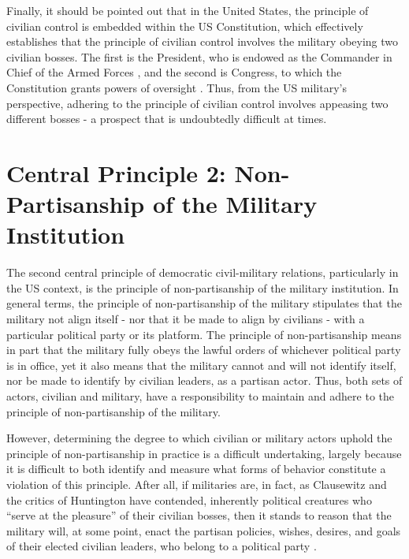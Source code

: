 \documentclass[
  12pt,
  oneside]{memoir}
\begin{document}
Finally, it should be pointed out that in the United States, the principle of civilian control is embedded within the US Constitution, which effectively establishes that the principle of civilian control involves the military obeying two civilian bosses. The first is the President, who is endowed as the Commander in Chief of the Armed Forces \autocite[Article 2, Section 2]{noauthor_us_1787}, and the second is Congress, to which the Constitution grants powers of oversight \autocite[Article 1, Section 8]{noauthor_us_1787}. Thus, from the US military's perspective, adhering to the principle of civilian control involves appeasing two different bosses - a prospect that is undoubtedly difficult at times.

\hypertarget{central-principle-2-non-partisanship-of-the-military-institution}{%
\section{Central Principle 2: Non-Partisanship of the Military Institution}\label{central-principle-2-non-partisanship-of-the-military-institution}}

The second central principle of democratic civil-military relations, particularly in the US context, is the principle of non-partisanship of the military institution. In general terms, the principle of non-partisanship of the military stipulates that the military not align itself - nor that it be made to align by civilians - with a particular political party or its platform. The principle of non-partisanship means in part that the military fully obeys the lawful orders of whichever political party is in office, yet it also means that the military cannot and will not identify itself, nor be made to identify by civilian leaders, as a partisan actor. Thus, both sets of actors, civilian and military, have a responsibility to maintain and adhere to the principle of non-partisanship of the military.

However, determining the degree to which civilian or military actors uphold the principle of non-partisanship in practice is a difficult undertaking, largely because it is difficult to both identify and measure what forms of behavior constitute a violation of this principle. After all, if militaries are, in fact, as Clausewitz and the critics of Huntington have contended, inherently political creatures who ``serve at the pleasure'' of their civilian bosses, then it stands to reason that the military will, at some point, enact the partisan policies, wishes, desires, and goals of their elected civilian leaders, who belong to a political party \autocite{mullen_chairman_2011}.
\end{document}

